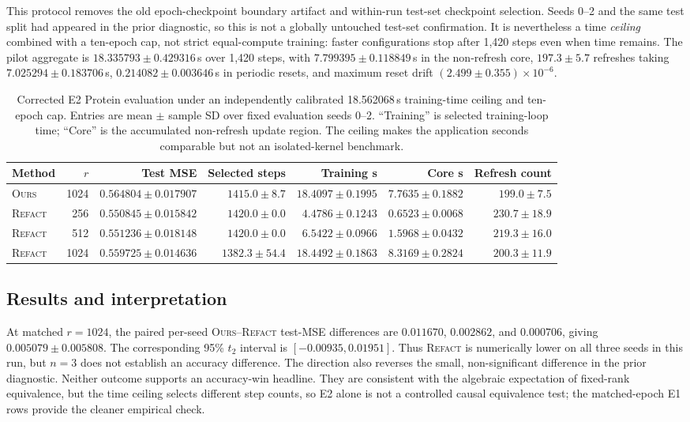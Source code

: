 \documentclass[11pt]{article}
\newcommand{\ours}{\textsc{Ours}}
\newcommand{\refact}{\textsc{Refact}}
\begin{document}
This protocol removes the old epoch-checkpoint boundary artifact and
within-run test-set checkpoint selection.  Seeds 0--2 and the same test split
had appeared in the prior diagnostic, so this is not a globally untouched
test-set confirmation.  It is nevertheless a time \emph{ceiling}
combined with a ten-epoch cap, not strict equal-compute training: faster
configurations stop after 1,420 steps even when time remains.  The pilot
aggregate is \(18.335793\pm0.429316\)\,s over 1,420 steps, with
\(7.799395\pm0.118849\)\,s in the non-refresh core,
\(197.3\pm5.7\) refreshes taking \(7.025294\pm0.183706\)\,s,
\(0.214082\pm0.003646\)\,s in periodic resets, and maximum reset drift
\((2.499\pm0.355)\times10^{-6}\).

\begin{table}[ht]
\centering
\scriptsize
\caption{Corrected E2 Protein evaluation under an independently calibrated
18.562068\,s training-time ceiling and ten-epoch cap.  Entries are
mean \(\pm\) sample SD over fixed evaluation seeds 0--2.  ``Training'' is
selected training-loop time; ``Core'' is the accumulated non-refresh update
region.  The ceiling makes the application seconds comparable but not an
isolated-kernel benchmark.}
\label{tab:e2-corrected}
{\setlength{\tabcolsep}{3.5pt}
\begin{tabular}{@{}lrrrrrr@{}}
\toprule
Method & \(r\) & Test MSE & Selected steps & Training s & Core s &
Refresh count \\
\midrule
\ours{} & 1024 &
  \(0.564804\pm0.017907\) & \(1415.0\pm8.7\) &
  \(18.4097\pm0.1995\) & \(7.7635\pm0.1882\) &
  \(199.0\pm7.5\) \\
\refact{} & 256 &
  \(0.550845\pm0.015842\) & \(1420.0\pm0.0\) &
  \(4.4786\pm0.1243\) & \(0.6523\pm0.0068\) &
  \(230.7\pm18.9\) \\
\refact{} & 512 &
  \(0.551236\pm0.018148\) & \(1420.0\pm0.0\) &
  \(6.5422\pm0.0966\) & \(1.5968\pm0.0432\) &
  \(219.3\pm16.0\) \\
\refact{} & 1024 &
  \(0.559725\pm0.014636\) & \(1382.3\pm54.4\) &
  \(18.4492\pm0.1863\) & \(8.3169\pm0.2824\) &
  \(200.3\pm11.9\) \\
\bottomrule
\end{tabular}
}
\end{table}

\subsection{Results and interpretation}

At matched \(r=1024\), the paired per-seed
\ours{}--\refact{} test-MSE differences are
\(0.011670\), \(0.002862\), and \(0.000706\), giving
\(0.005079\pm0.005808\).  The corresponding 95\% \(t_2\) interval is
\([-0.00935,0.01951]\).  Thus \refact{} is numerically lower on all three
seeds in this run, but \(n=3\) does not establish an accuracy difference.
The direction also reverses the small, non-significant difference in the
prior diagnostic.  Neither outcome supports an accuracy-win headline.  They
are consistent with the algebraic expectation of fixed-rank equivalence, but
the time ceiling selects different step counts, so E2 alone is not a
controlled causal equivalence test; the matched-epoch E1 rows provide the
cleaner empirical check.
\end{document}
